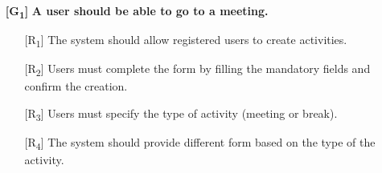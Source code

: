 \documentclass[12pt,titlepage]{article}
\begin{document}
\begin{itemize}

\item[\textbf{ {[G\textsubscript{1}]}}]	\textbf{	A user should be able to go to a meeting.}
\begin{itemize}
\item[{[R\textsubscript{1}]}] The system should allow registered users to create activities.
\item[{[R\textsubscript{2}]}] Users must complete the form by filling the mandatory fields and confirm the creation.
\item[{[R\textsubscript{3}]}] Users must specify the type of activity (meeting or break).
\item[{[R\textsubscript{4}]}] The system should provide different form based on the type of the activity.


\end{itemize}
\end{itemize}
\end{document}
